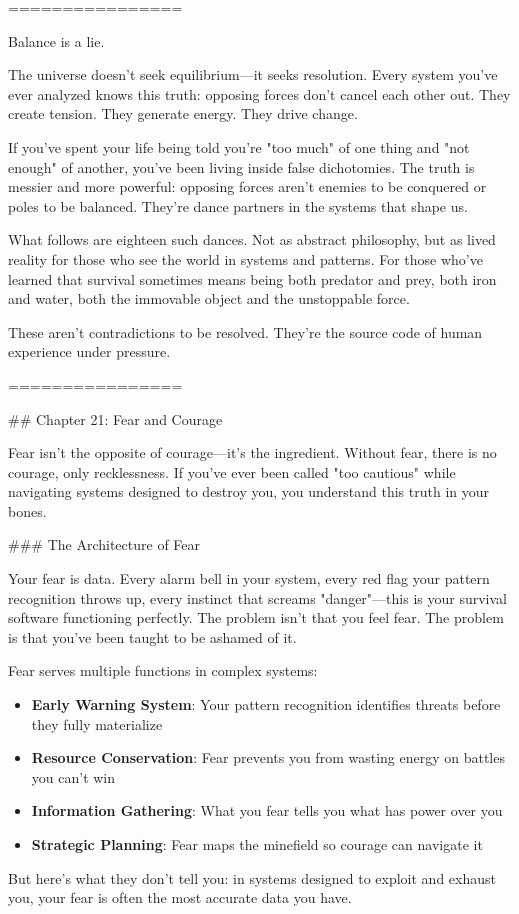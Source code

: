 \documentclass[12pt]{book}
\begin{document}
================

Balance is a lie.

The universe doesn't seek equilibrium—it seeks resolution. Every system you've ever analyzed knows this truth: opposing forces don't cancel each other out. They create tension. They generate energy. They drive change.

If you've spent your life being told you're "too much" of one thing and "not enough" of another, you've been living inside false dichotomies. The truth is messier and more powerful: opposing forces aren't enemies to be conquered or poles to be balanced. They're dance partners in the systems that shape us.

What follows are eighteen such dances. Not as abstract philosophy, but as lived reality for those who see the world in systems and patterns. For those who've learned that survival sometimes means being both predator and prey, both iron and water, both the immovable object and the unstoppable force.

These aren't contradictions to be resolved. They're the source code of human experience under pressure.

================

\#\# Chapter 21: Fear and Courage

Fear isn't the opposite of courage—it's the ingredient. Without fear, there is no courage, only recklessness. If you've ever been called "too cautious" while navigating systems designed to destroy you, you understand this truth in your bones.

\#\#\# The Architecture of Fear

Your fear is data. Every alarm bell in your system, every red flag your pattern recognition throws up, every instinct that screams "danger"—this is your survival software functioning perfectly. The problem isn't that you feel fear. The problem is that you've been taught to be ashamed of it.

Fear serves multiple functions in complex systems:

\begin{itemize}
\item \textbf{Early Warning System}: Your pattern recognition identifies threats before they fully materialize
\item \textbf{Resource Conservation}: Fear prevents you from wasting energy on battles you can't win
\item \textbf{Information Gathering}: What you fear tells you what has power over you
\item \textbf{Strategic Planning}: Fear maps the minefield so courage can navigate it

\end{itemize}
But here's what they don't tell you: in systems designed to exploit and exhaust you, your fear is often the most accurate data you have.
\end{document}

